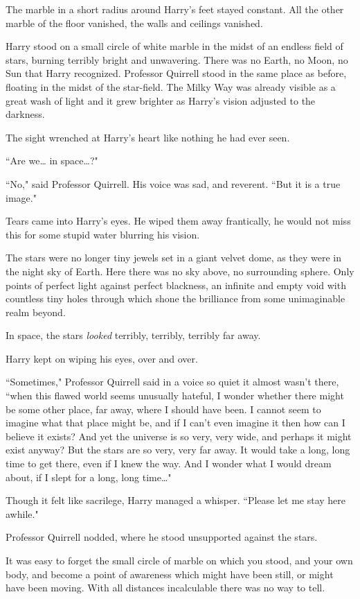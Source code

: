 The marble in a short radius around Harry's feet stayed constant. All the other marble of the floor vanished, the walls and ceilings vanished.

Harry stood on a small circle of white marble in the midst of an endless field of stars, burning terribly bright and unwavering. There was no Earth, no Moon, no Sun that Harry recognized. Professor Quirrell stood in the same place as before, floating in the midst of the star-field. The Milky Way was already visible as a great wash of light and it grew brighter as Harry's vision adjusted to the darkness.

The sight wrenched at Harry's heart like nothing he had ever seen.

``Are we{\ldots} in space{\ldots}?"

``No," said Professor Quirrell. His voice was sad, and reverent. ``But it is a true image."

Tears came into Harry's eyes. He wiped them away frantically, he would not miss this for some stupid water blurring his vision.

The stars were no longer tiny jewels set in a giant velvet dome, as they were in the night sky of Earth. Here there was no sky above, no surrounding sphere. Only points of perfect light against perfect blackness, an infinite and empty void with countless tiny holes through which shone the brilliance from some unimaginable realm beyond.

In space, the stars \emph{looked} terribly, terribly, terribly far away.

Harry kept on wiping his eyes, over and over.

``Sometimes," Professor Quirrell said in a voice so quiet it almost wasn't there, ``when this flawed world seems unusually hateful, I wonder whether there might be some other place, far away, where I should have been. I cannot seem to imagine what that place might be, and if I can't even imagine it then how can I believe it exists? And yet the universe is so very, very wide, and perhaps it might exist anyway? But the stars are so very, very far away. It would take a long, long time to get there, even if I knew the way. And I wonder what I would dream about, if I slept for a long, long time{\ldots}"

Though it felt like sacrilege, Harry managed a whisper. ``Please let me stay here awhile."

Professor Quirrell nodded, where he stood unsupported against the stars.

It was easy to forget the small circle of marble on which you stood, and your own body, and become a point of awareness which might have been still, or might have been moving. With all distances incalculable there was no way to tell.


